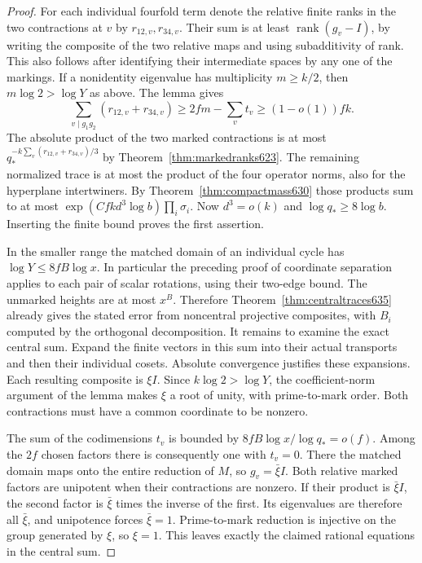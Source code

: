 \documentclass[a4paper,11pt]{article}
\theoremstyle{definition}
\theoremstyle{remark}
\numberwithin{equation}{section}
\begin{document}
\begin{proof}
For each individual fourfold term denote the relative finite ranks in
the two contractions at \(v\) by \(r_{12,v},r_{34,v}\). Their sum
is at least \(\operatorname{rank}(g_v-I)\), by writing the composite
of the two relative maps and using subadditivity of rank. This also
follows after identifying their intermediate spaces by any one of
the markings. If a nonidentity eigenvalue has multiplicity
\(m\ge k/2\), then \(m\log2>\log Y\) as above. The lemma gives
\[
      \sum_{v\mid g_1g_2}(r_{12,v}+r_{34,v})
                 \ge 2fm-\sum_v t_v\ge (1-o(1))fk .
\]
The absolute product of the two marked contractions is at most
\(q_*^{-k\sum_v(r_{12,v}+r_{34,v})/3}\) by
Theorem~\ref{thm:markedranks623}. The remaining normalized
trace is at most the product of the four operator norms, also
for the hyperplane intertwiners. By Theorem~\ref{thm:compactmass630}
those products sum to at most
\(\exp(C f k d^3\log b)\prod_i\sigma_i\). Now \(d^3=o(k)\)
and \(\log q_*\ge8\log b\). Inserting the finite bound proves
the first assertion.

In the smaller range the matched domain of an individual cycle
has \(\log Y\le8fB\log x\). In particular the preceding proof of
coordinate separation applies to each pair of scalar rotations,
using their two-edge bound. The unmarked heights are at most \(x^B\).
Therefore Theorem~\ref{thm:centraltraces635} already gives the stated
error from noncentral projective composites, with \(B_i\) computed
by the orthogonal decomposition. It remains to examine the exact
central sum. Expand the finite vectors in this sum into their actual
transports and then their individual cosets. Absolute convergence
justifies these expansions. Each resulting composite is \(\xi I\).
Since \(k\log2>\log Y\), the coefficient-norm argument of the lemma
makes \(\xi\) a root of unity, with prime-to-mark order. Both
contractions must have a common coordinate to be nonzero.

The sum of the codimensions \(t_v\) is bounded by
\(8fB\log x/\log q_*=o(f)\). Among the \(2f\) chosen factors
there is consequently one with \(t_v=0\). There the matched
domain maps onto the entire reduction of \(M\), so
\(g_v=\bar\xi I\). Both relative marked factors are unipotent
when their contractions are nonzero. If their product is
\(\bar\xi I\), the second factor is \(\bar\xi\) times the inverse
of the first. Its eigenvalues are therefore all \(\bar\xi\), and
unipotence forces \(\bar\xi=1\). Prime-to-mark reduction is
injective on the group generated by \(\xi\), so \(\xi=1\).
This leaves exactly the claimed rational equations in the
central sum.
\end{proof}
\end{document}
